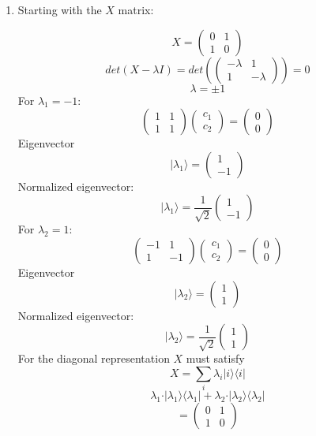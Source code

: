 \documentclass[12pt]{article}
\newcommand{\ket}[1]{\vert{#1}\rangle}
\newcommand{\bra}[1]{\langle{#1}\vert}
\begin{document}
\begin{enumerate}
\item Starting with the $X$ matrix:

$$ X = \left(\begin{array}{cc} 0 & 1 \\ 1 & 0  \end{array}\right) $$
$$ det(X-\lambda I) = det(\left(\begin{array}{cc} -\lambda & 1 \\ 1 & -\lambda  \end{array}\right) ) = 0 $$
$$ \lambda = \pm 1 $$ 
For $\lambda_1 = -1$:
$$ \left(\begin{array}{cc} 1 & 1 \\ 1 & 1  \end{array}\right) \left(\begin{array}{cc} c_1 \\ c_2 \end{array}\right) = \left(\begin{array}{cc} 0 \\ 0 \end{array}\right) $$
Eigenvector 
$$ \ket{\lambda_1} =  \left(\begin{array}{cc} 1 \\ -1\end{array}\right) $$
Normalized eigenvector: 
$$  \ket{\lambda_1} = \frac{1}{\sqrt{2}} \left(\begin{array}{cc} 1 \\ -1\end{array}\right) $$
For $\lambda_2 =1$:
$$ \left(\begin{array}{cc} -1 & 1 \\ 1 & -1  \end{array}\right) \left(\begin{array}{cc} c_1 \\ c_2 \end{array}\right) = \left(\begin{array}{cc} 0 \\ 0 \end{array}\right) $$
Eigenvector 
$$ \ket{\lambda_2} =  \left(\begin{array}{cc} 1 \\ 1\end{array}\right) $$
Normalized eigenvector: 
$$  \ket{\lambda_2} = \frac{1}{\sqrt{2}} \left(\begin{array}{cc} 1 \\ 1\end{array}\right) $$
For the diagonal representation $X$ must satisfy 
$$ X = \sum_i \lambda_i \ket{i}\bra{i} $$
$$ \lambda_1 \cdot \ket{\lambda_1}\bra{\lambda_1} + \lambda_2 \cdot \ket{\lambda_2}\bra{\lambda_2} $$
$$ = \left(\begin{array}{cc} 0 & 1 \\ 1 & 0\end{array}\right) $$




\end{enumerate}
\end{document}

